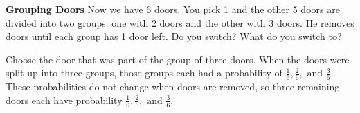 \question \textbf{Grouping Doors} \newline
Now we have 6 doors. You pick 1 and the other 5 doors are divided into 
two groups: one with 2 doors and the other with 3 doors. He removes doors
until each group has 1 door left. Do you switch? What do you switch to?	

\begin{solution}[3 cm]
Choose the door that was part of the group of three doors. When the doors 
were split up into three groups, those groups each had a probability of 
$\frac{1}{6}, \frac{2}{6},\text{ and } \frac{3}{6}$. These probabilities 
do not change when doors are removed, so three remaining doors each have 
probability $\frac{1}{6}, \frac{2}{6},\text{ and } \frac{3}{6}$. 
 \end{solution}